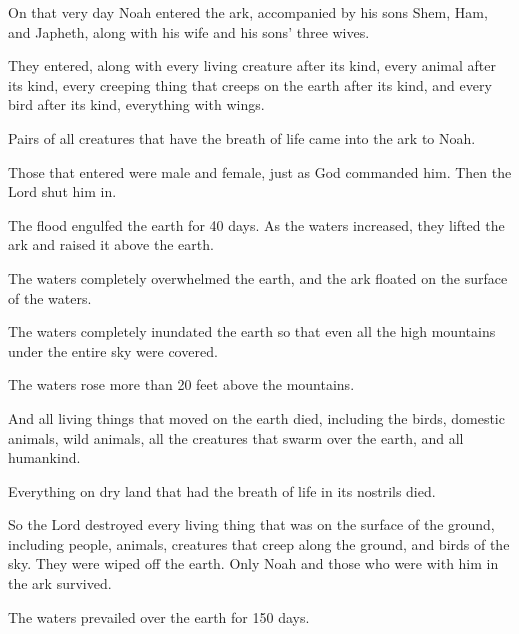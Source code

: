 \begin{scripture}
 On that very day Noah entered the ark, accompanied by his sons Shem, Ham, and Japheth, along with his wife and his sons' three wives.
 They entered, along with every living creature after its kind, every animal after its kind, every creeping thing that creeps on the earth after its kind, and every bird after its kind, everything with wings.
 Pairs of all creatures that have the breath of life came into the ark to Noah.
 Those that entered were male and female, just as God commanded him. Then the Lord shut him in.
\everypar{}

 The flood engulfed the earth for 40 days. As the waters increased, they lifted the ark and raised it above the earth.
 The waters completely overwhelmed the earth, and the ark floated on the surface of the waters.
 The waters completely inundated the earth so that even all the high mountains under the entire sky were covered.
 The waters rose more than 20 feet above the mountains.
 And all living things that moved on the earth died, including the birds, domestic animals, wild animals, all the creatures that swarm over the earth, and all humankind.
 Everything on dry land that had the breath of life in its nostrils died.
 So the Lord destroyed every living thing that was on the surface of the ground, including people, animals, creatures that creep along the ground, and birds of the sky. They were wiped off the earth. Only Noah and those who were with him in the ark survived.
 The waters prevailed over the earth for 150 days.


\end{scripture}
